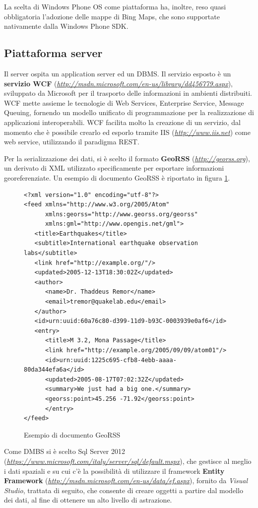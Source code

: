La scelta di Windows Phone OS come piattaforma ha, inoltre, reso quasi obbligatoria l'adozione delle mappe di Bing Maps, che sono supportate nativamente dalla Windows Phone SDK.

\subsection{Piattaforma server}
Il server ospita un application server ed un DBMS.
Il servizio esposto è un \textbf{servizio WCF} (\emph{\url{http://msdn.microsoft.com/en-us/library/dd456779.aspx}}), sviluppato da Microsoft per il trasporto delle informazioni in ambienti distribuiti.
WCF mette assieme le tecnologie di Web Services, Enterprise Service, Message Queuing, fornendo un modello unificato di programmazione per la realizzazione di applicazioni interoperabili.
WCF facilita molto la creazione di un servizio, dal momento che è possibile crearlo ed esporlo tramite IIS (\emph{\url{http://www.iis.net}}) come web service, utilizzando il paradigma REST.

Per la serializzazione dei dati, si è scelto il formato \textbf{GeoRSS} (\emph{\url{http://georss.org}}), un derivato di XML utilizzato specificamente per esportare informazioni georeferenziate.
Un esempio di documento GeoRSS è riportato in figura \ref{georssimage}.
\begin{figure}[h!]
\lstset{language=MYXML}
\begin{lstlisting}
<?xml version="1.0" encoding="utf-8"?>
<feed xmlns="http://www.w3.org/2005/Atom" 
      xmlns:georss="http://www.georss.org/georss" 
      xmlns:gml="http://www.opengis.net/gml">
   <title>Earthquakes</title>
   <subtitle>International earthquake observation labs</subtitle>
   <link href="http://example.org/"/>
   <updated>2005-12-13T18:30:02Z</updated>
   <author>
      <name>Dr. Thaddeus Remor</name>
      <email>tremor@quakelab.edu</email>
   </author>
   <id>urn:uuid:60a76c80-d399-11d9-b93C-0003939e0af6</id>
   <entry>
      <title>M 3.2, Mona Passage</title>
      <link href="http://example.org/2005/09/09/atom01"/>
      <id>urn:uuid:1225c695-cfb8-4ebb-aaaa-80da344efa6a</id>
      <updated>2005-08-17T07:02:32Z</updated>
      <summary>We just had a big one.</summary>
      <georss:point>45.256 -71.92</georss:point>
      </entry>
</feed>
\end{lstlisting}
\caption{Esempio di documento GeoRSS\label{georssimage}}
\end{figure}

Come DMBS si è scelto Sql Server 2012 (\emph{\url{https://www.microsoft.com/italy/server/sql/default.mspx}}), che gestisce al meglio i dati spaziali e su cui c'è la possibilità di utilizzare il framework \textbf{Entity Framework} (\emph{\url{http://msdn.microsoft.com/en-us/data/ef.aspx}}), fornito da \textit{Visual Studio}, trattata di seguito, che consente di creare oggetti a partire dal modello dei dati, al fine di ottenere un alto livello di astrazione.  

